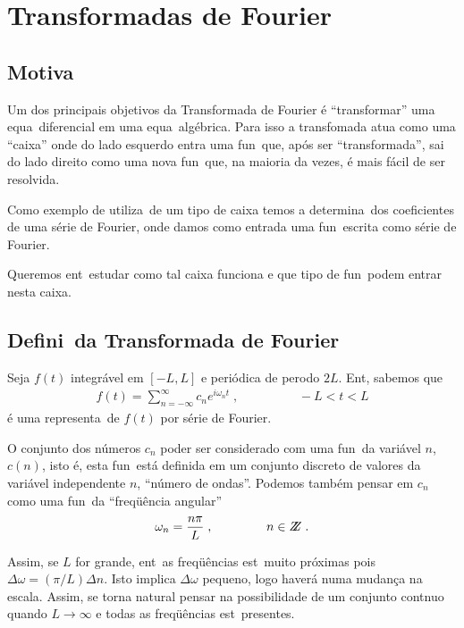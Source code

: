 
\section{Transformadas de Fourier}

\subsection{Motiva\cao}

Um dos principais objetivos da Transformada de Fourier \'e ``transformar''
uma equa\cao\ dife\-rencial em uma equa\cao\ alg\'ebrica. Para isso a
transfomada atua como uma ``caixa'' onde do lado esquerdo entra uma
fun\cao\ que, ap\'os ser ``transformada'', sai do lado direito como uma
nova fun\cao\ que, na maioria da vezes, \'e mais f\'acil de ser
resolvida.

Como exemplo de utiliza\cao\ de um tipo de caixa temos a determina\cao\
dos coeficientes de uma s\'erie de Fourier, onde damos como entrada
uma fun\cao\ escrita como s\'erie de Fourier.

Queremos ent\ao\ estudar como tal caixa funciona e que tipo de fun\coes\
podem entrar nesta caixa.


\subsection{Defini\cao\ da Transformada de Fourier} 

Seja $f(t)$ integr\'avel em $[-L,L]$ e peri\'odica de per\ih odo $2L$.
Ent\ao, sabemos que
\begin{eqnarray}
f(t) = \sum_{n=-\infty}^{\infty} c_n e^{i \omega_n t} \; , 
\hspace{2cm} -L < t < L
\end{eqnarray}
\'e uma representa\cao\ de $f(t)$ por s\'erie de Fourier.

O conjunto dos n\'umeros $c_n$ poder ser considerado com uma fun\cao\
da vari\'avel $n$, $c(n)$, isto \'e, esta fun\cao\ est\'a definida em
um conjunto discreto de valores da vari\'avel independente $n$,
``n\'umero de ondas''. Podemos tamb\'em pensar em $c_n$ como uma fun\cao\
da ``freq\"u\^encia angular''
\begin{eqnarray}
\omega_n = \frac{n \pi}{L} \; , \hspace{1.5cm} n \in Z \!\!\! Z \; .
\end{eqnarray}

Assim, se $L$ for grande, ent\ao\ as freq\"u\^encias est\ao\ muito
pr\'oximas pois $\Delta \omega = (\pi/L)\Delta n$. Isto implica
$\Delta \omega$ pequeno, logo haver\'a numa mudan\c ca na escala.
Assim, se torna natural pensar na possibilidade de um conjunto cont\ih nuo
quando $L \longrightarrow \infty$ e todas as freq\"u\^encias est\ao\
presentes.

